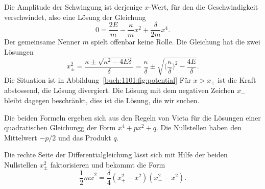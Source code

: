 \begin{loesung}
\begin{teilaufgaben}
%
\item
Die Amplitude der Schwingung ist derjenige $x$-Wert, für den
die Geschwindigkeit verschwindet, also eine Lösung der Gleichung
\[
0
=
\frac{2E}{m} -\frac{\kappa}{m}x^2 + \frac{\delta}{2m}x^4.
\]
Der gemeinsame Nenner $m$ spielt offenbar keine Rolle.
Die Gleichung hat die zwei Lösungen
\[
x_{\pm}^2
=
\frac{\kappa \pm \sqrt{\kappa^2-4E\delta}}{\delta}
=
\frac{\kappa}{\delta}
\pm
\sqrt{
\biggl(\frac{\kappa}{\delta}\biggr)^2
-
\frac{4E}{\delta}
}.
\]
Die Situation ist in Abbildung~\ref{buch:1101:fig:potential}
Für $x>x_+$ ist die Kraft abstossend, die Lösung divergiert.
Die Lösung mit dem negativen Zeichen $x_-$ bleibt dagegen beschränkt,
dies ist die Lösung, die wir suchen.

\item
Die beiden Formeln ergeben sich aus den Regeln von Vieta für die
Lösungen einer quadratischen Gleichungg der Form $x^4+px^2+q$.
Die Nullstellen haben den Mittelwert $-p/2$ und das Produkt $q$.

\item
Die rechte Seite der Differentialgleichung lässt sich mit Hilfe
der beiden Nullstellen $x_{\pm}^2$ faktorisieren und bekommt die Form
\[
\frac12m\dot{x}^2
=
\frac{\delta}{4}(x_+^2-x^2)(x_-^2-x^2).
\]


\end{teilaufgaben}
\end{loesung}
